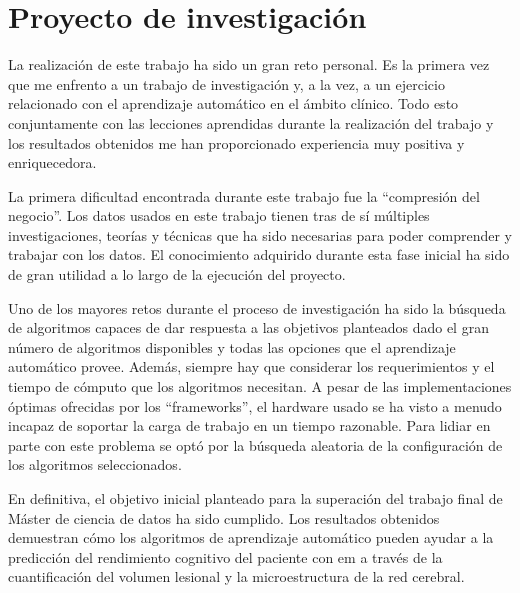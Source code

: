 \section{Proyecto de investigación}
La realización de este trabajo ha sido un gran reto personal. Es la primera vez que me enfrento a un trabajo de investigación y, a la vez, a un ejercicio relacionado con el aprendizaje automático en el ámbito clínico. Todo esto conjuntamente con las lecciones aprendidas durante la realización del trabajo y los resultados obtenidos me han proporcionado experiencia muy positiva y enriquecedora.

La primera dificultad encontrada durante este trabajo fue la ``compresión del negocio''. Los datos usados en este trabajo tienen tras de sí múltiples investigaciones, teorías y técnicas que ha sido necesarias para poder comprender y trabajar con los datos. El conocimiento adquirido durante esta fase inicial ha sido de gran utilidad a lo largo de la ejecución del proyecto.

Uno de los mayores retos durante el proceso de investigación ha sido la búsqueda de algoritmos capaces de dar respuesta a las objetivos planteados dado el gran número de algoritmos disponibles y todas las opciones que el aprendizaje automático provee. Además, siempre hay que considerar los requerimientos y el tiempo de cómputo que los algoritmos necesitan. A pesar de las implementaciones óptimas ofrecidas por los  ``frameworks'', el hardware usado se ha visto a menudo incapaz de soportar la carga de trabajo en un tiempo razonable. Para lidiar en parte con este problema se optó por la búsqueda aleatoria de la configuración de los algoritmos seleccionados. 

En definitiva, el objetivo inicial planteado para la superación del trabajo final de Máster de ciencia de datos ha sido cumplido. Los resultados obtenidos demuestran  cómo los algoritmos de aprendizaje automático pueden ayudar a la predicción del rendimiento cognitivo del paciente con \gls{em} a través de la cuantificación del volumen lesional y la microestructura de la red cerebral.
